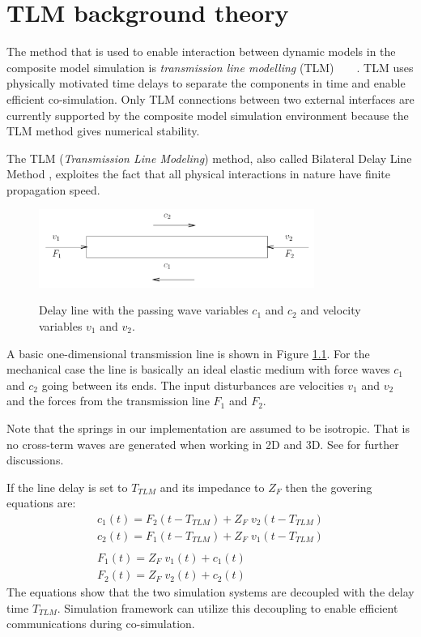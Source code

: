 \chapter{TLM background theory}
\label{secTLMtheory}
The method that is used to enable interaction between dynamic models in the composite model simulation is \emph{transmission line modelling} (TLM)~\cite{Johns-80}~\cite{KrusModMech-99}~\cite{KrusDistrSim}~\cite{Cogan-06}.
TLM uses physically motivated time delays to separate the components in time and enable efficient co-simulation. 
Only TLM connections between two external interfaces are currently supported by the composite model simulation environment because the TLM method gives numerical stability.


The TLM (\emph{Transmission Line Modeling}) method, also called Bilateral Delay Line Method \cite{Johns-80}, exploites the fact that all physical interactions in nature have finite propagation speed.
\begin{figure}
\begin{center}
   {\includegraphics[width=9cm]{figs/TLMline.png}}
\end{center}
\caption{Delay line with the passing wave variables $c_1$ and $c_2$
	and velocity variables $v_1$ and $v_2$.}
\label{figTLMline}
\end{figure}

A basic one-dimensional transmission line is shown in Figure \ref{figTLMline}.
For the mechanical case the line is basically an ideal elastic medium with force waves $c_1$ and $c_2$ going between its ends. 
The input disturbances are velocities $v_1$ and $v_2$ and the forces from the transmission line $F_1$ and $F_2$.

Note that the springs in our implementation are assumed to be isotropic.
That is no cross-term waves are generated when working in 2D and 3D. 
See \cite{KrusModMech-99} for further discussions.

If the line delay is set to $T_{TLM}$ and its impedance to $Z_F$ then the govering equations are:
\begin{equation}
\begin{array}{l}
c_1(t) = F_2(t-T_{TLM})+ Z_F \; v_2(t-T_{TLM})\\
c_2(t) = F_1(t-T_{TLM})+ Z_F \; v_1(t-T_{TLM})\\
\\
F_1(t) = Z_F \; v_1(t) + c_1(t) \\
F_2(t) = Z_F \; v_2(t) + c_2(t)
\end{array}
\label{eqTLM}
\end{equation}
The equations show that the two simulation systems are decoupled with the delay time $T_{TLM}$. Simulation framework can utilize this decoupling to enable efficient communications during co-simulation. 

